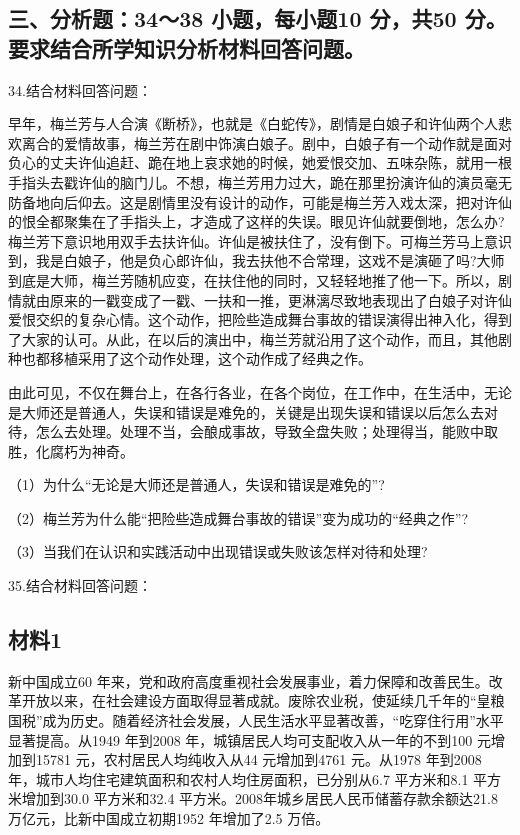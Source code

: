 \documentclass[UTF8,11pt]{ctexart}
\begin{document}
\subsection*{三、分析题：34～38 小题，每小题10 分，共50 分。要求结合所学知识分析材料回答问题。}

34.结合材料回答问题：

早年，梅兰芳与人合演《断桥》，也就是《白蛇传》，剧情是白娘子和许仙两个人悲欢离合的爱情故事，梅兰芳在剧中饰演白娘子。剧中，白娘子有一个动作就是面对负心的丈夫许仙追赶、跪在地上哀求她的时候，她爱恨交加、五味杂陈，就用一根手指头去戳许仙的脑门儿。不想，梅兰芳用力过大，跪在那里扮演许仙的演员毫无防备地向后仰去。这是剧情里没有设计的动作，可能是梅兰芳入戏太深，把对许仙的恨全都聚集在了手指头上，才造成了这样的失误。眼见许仙就要倒地，怎么办?梅兰芳下意识地用双手去扶许仙。许仙是被扶住了，没有倒下。可梅兰芳马上意识到，我是白娘子，他是负心郎许仙，我去扶他不合常理，这戏不是演砸了吗?大师到底是大师，梅兰芳随机应变，在扶住他的同时，又轻轻地推了他一下。所以，剧情就由原来的一戳变成了一戳、一扶和一推，更淋漓尽致地表现出了白娘子对许仙爱恨交织的复杂心情。这个动作，把险些造成舞台事故的错误演得出神入化，得到了大家的认可。从此，在以后的演出中，梅兰芳就沿用了这个动作，而且，其他剧种也都移植采用了这个动作处理，这个动作成了经典之作。

由此可见，不仅在舞台上，在各行各业，在各个岗位，在工作中，在生活中，无论是大师还是普通人，失误和错误是难免的，关键是出现失误和错误以后怎么去对待，怎么去处理。处理不当，会酿成事故，导致全盘失败；处理得当，能败中取胜，化腐朽为神奇。

（1）为什么“无论是大师还是普通人，失误和错误是难免的”?


（2）梅兰芳为什么能“把险些造成舞台事故的错误”变为成功的“经典之作”?


（3）当我们在认识和实践活动中出现错误或失败该怎样对待和处理?


35.结合材料回答问题：


\subsection*{材料1}

新中国成立60 年来，党和政府高度重视社会发展事业，着力保障和改善民生。改革开放以来，在社会建设方面取得显著成就。废除农业税，使延续几千年的“皇粮国税”成为历史。随着经济社会发展，人民生活水平显著改善，“吃穿住行用”水平显著提高。从1949 年到2008 年，城镇居民人均可支配收入从一年的不到100 元增加到15781 元，农村居民人均纯收入从44 元增加到4761 元。从1978 年到2008 年，城市人均住宅建筑面积和农村人均住房面积，已分别从6.7 平方米和8.1 平方米增加到30.0 平方米和32.4 平方米。2008年城乡居民人民币储蓄存款余额达21.8 万亿元，比新中国成立初期1952 年增加了2.5 万倍。
\end{document}
